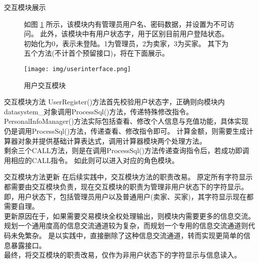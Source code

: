\documentclass[10pt]{beamer}
\begin{document}
\begin{frame}{交互模块展示}
    \begin{figure}[HTB]
        \begin{minipage}{0.6\textwidth}
            如图 \ref{UserInterface} 所示，该模块内有管理员用户名、密码数据，并设置为不可访问。
            此外，该模块中有用户状态字，用于区别目前用户登陆状态。
            初始化为0，表示未登陆。1为管理员，2为卖家，3为买家。
            其下为五个方法(不计首个预留接口)，将在下面展示。
        \end{minipage}
        \begin{minipage}{0.3\textwidth}
            \centering
            \texttt{[image: img/userinterface.png]}
            \caption{用户交互模块}
            \label{UserInterface}
        \end{minipage}
    \end{figure}
\end{frame}

\begin{frame}{交互模块方法}
    UserRegister()方法首先校验用户状态字，正确则向模块内datasystem\_对象调用ProcessSql()方法，传递特殊修改指令。\\
    PersonalInfoManager()方法实际包括查看、修改个人信息与充值功能，具体实现仍是调用ProcessSql()方法，传递查看、修改指令即可。
    计算金额，则需要生成计算器对象并提供基础计算表达式，调用计算器模块两个处理方法。\\
    剩余三个CALL方法，则是在调用ProcessSql()方法传递查询指令后，若成功即调用相应的CALL指令。
    如此则可以进入对应的角色模块。\\
\end{frame}

\begin{frame}{交互模块方法更新}
    在后续实践中，交互模块方法的职责改易。
    原定所有字符显示都需要由交互模块负责，现在交互模块的职责为管理非用户状态下的字符显示。\\
    即，用户状态下，包括管理员用户以及普通用户(卖家、买家)，其字符显示现在都需要自理。\\
    更新原因在于，如果需要交易模块全权处理输出，则模块内需要更多的信息交流。
    规划一个通用度高的信息交流通道较为复杂，而规划一个专用的信息交流通道则代码未免繁杂。
    是以实践中，直接删除了这种信息交流通道，转而实现更简单的信息暴露接口。\\
    最终，将交互模块的职责改易，仅作为非用户状态下的字符显示与信息读入。
\end{frame}
\end{document}
